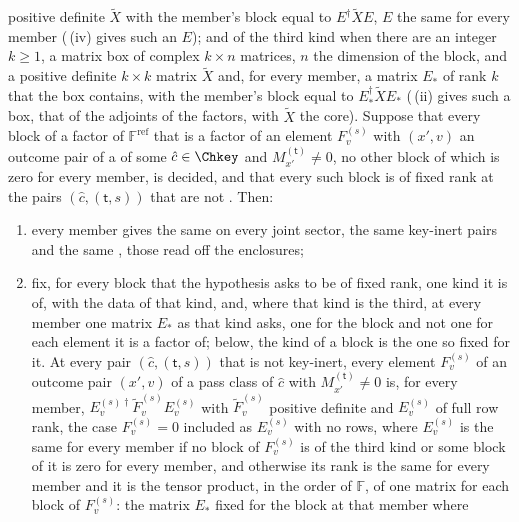 \begin{lemma}
positive definite $\widetilde X$ with the member's block equal to
$E^{\dagger}\widetilde XE$, $E$ the same for every member
(\,(iv) gives such an
$E$); and of the third kind when there are an integer $k\ge1$, a matrix box
of complex $k\times n$ matrices, $n$ the dimension of the block, and a
positive definite $k\times k$ matrix $\widetilde X$ and, for every member, a
matrix $E_{*}$ of rank $k$ that the box contains, with the member's block
equal to $E_{*}^{\dagger}\widetilde XE_{*}$
(\,(ii) gives such a box,
that of the adjoints of the factors, with $\widetilde X$ the core). Suppose
that every block of a factor of $\mathbb{F}^{\mathrm{ref}}$ that is a factor
of an element $F^{(s)}_v$ with $(x',v)$ an outcome pair of a 
of some $\hat c\in\Chkey$ and $M^{(\mathsf t)}_{x'}\ne0$, no other block of
which is zero for every member, is decided, and that every such block is of
fixed rank at the pairs $(\hat c,(\mathsf t,s))$ that are not
. Then:
  \begin{enumerate}[label=(\alph*),leftmargin=2.2em]
  \item every member gives the same
     on every joint
    sector, the same key-inert pairs and the same
    , those
    read off the enclosures;
  \item fix, for every block that the hypothesis asks to be of fixed rank,
    one kind it is of, with the data of that kind, and, where that kind is
    the third, at every member one matrix $E_{*}$ as that kind asks, one for
    the block and not one for each element it is a factor of; below, the
    kind of a block is the one so fixed for it. At every pair
    $(\hat c,(\mathsf t,s))$ that is not key-inert, every
    element $F^{(s)}_v$ of an outcome pair $(x',v)$ of a pass class of
    $\hat c$ with $M^{(\mathsf t)}_{x'}\ne0$ is, for every member,
    $E^{(s)\dagger}_v\widetilde F^{(s)}_vE^{(s)}_v$ with
    $\widetilde F^{(s)}_v$ positive definite and $E^{(s)}_v$ of full row
    rank, the case $F^{(s)}_v=0$ included as $E^{(s)}_v$ with no rows, where
    $E^{(s)}_v$ is the same for every member if no block of $F^{(s)}_v$ is of
    the third kind or some block of it is zero for every member, and
    otherwise its rank is the same for every member and it is the tensor
    product, in the order of $\mathbb{F}$, of one matrix for each block of
    $F^{(s)}_v$: the matrix $E_{*}$ fixed for the block at that member where

\end{enumerate}
\end{lemma}
